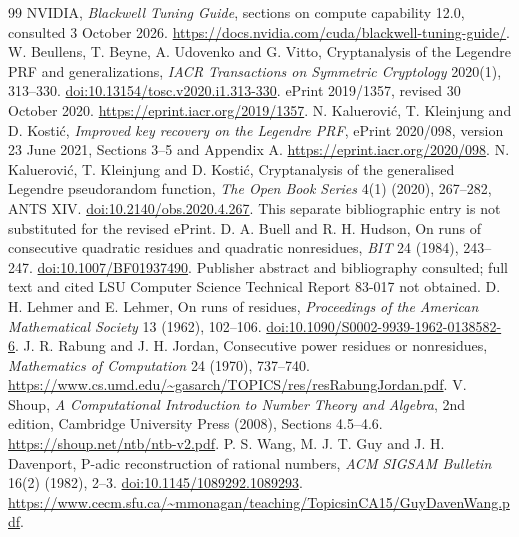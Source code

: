 \documentclass[11pt]{article}
\theoremstyle{definition}\newtheorem{remark}[theorem]{Remark}
\begin{document}
\begin{thebibliography}{99}
NVIDIA, \emph{Blackwell Tuning Guide}, sections on compute capability 12.0,
consulted 3 October 2026.
\url{https://docs.nvidia.com/cuda/blackwell-tuning-guide/}.
W. Beullens, T. Beyne, A. Udovenko and G. Vitto,
Cryptanalysis of the Legendre PRF and generalizations,
\emph{IACR Transactions on Symmetric Cryptology} 2020(1), 313--330.
\href{https://doi.org/10.13154/tosc.v2020.i1.313-330}{doi:10.13154/tosc.v2020.i1.313-330}.
ePrint 2019/1357, revised 30 October 2020. \url{https://eprint.iacr.org/2019/1357}.
N. Kalu\dj erovi\'c, T. Kleinjung and D. Kosti\'c,
\emph{Improved key recovery on the Legendre PRF}, ePrint 2020/098,
version 23 June 2021, Sections 3--5 and Appendix A.
\url{https://eprint.iacr.org/2020/098}.
N. Kalu\dj erovi\'c, T. Kleinjung and D. Kosti\'c,
Cryptanalysis of the generalised Legendre pseudorandom function,
\emph{The Open Book Series} 4(1) (2020), 267--282, ANTS XIV.
\href{https://doi.org/10.2140/obs.2020.4.267}{doi:10.2140/obs.2020.4.267}.
This separate bibliographic entry is not substituted for the revised ePrint.
D. A. Buell and R. H. Hudson, On runs of consecutive quadratic residues
and quadratic nonresidues, \emph{BIT} 24 (1984), 243--247.
\href{https://doi.org/10.1007/BF01937490}{doi:10.1007/BF01937490}.
Publisher abstract and bibliography consulted; full text and cited LSU
Computer Science Technical Report 83-017 not obtained.
D. H. Lehmer and E. Lehmer, On runs of residues,
\emph{Proceedings of the American Mathematical Society} 13 (1962), 102--106.
\href{https://doi.org/10.1090/S0002-9939-1962-0138582-6}{doi:10.1090/S0002-9939-1962-0138582-6}.
J. R. Rabung and J. H. Jordan, Consecutive power residues or nonresidues,
\emph{Mathematics of Computation} 24 (1970), 737--740.
\url{https://www.cs.umd.edu/~gasarch/TOPICS/res/resRabungJordan.pdf}.
V. Shoup, \emph{A Computational Introduction to Number Theory and Algebra},
2nd edition, Cambridge University Press (2008), Sections 4.5--4.6.
\url{https://shoup.net/ntb/ntb-v2.pdf}.
P. S. Wang, M. J. T. Guy and J. H. Davenport,
P-adic reconstruction of rational numbers,
\emph{ACM SIGSAM Bulletin} 16(2) (1982), 2--3.
\href{https://doi.org/10.1145/1089292.1089293}{doi:10.1145/1089292.1089293}.
\url{https://www.cecm.sfu.ca/~mmonagan/teaching/TopicsinCA15/GuyDavenWang.pdf}.
\end{thebibliography}
\end{document}
